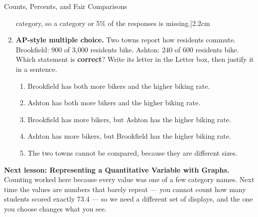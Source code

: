 \documentclass[12pt]{article}
\newcommand{\answerspace}[2]{\par\nopagebreak\noindent\begin{minipage}[t][#1][t]{\linewidth}%
  \color{keyred}\bfseries #2\end{minipage}\par}
\begin{document}
\begin{notesbox}{Counts, Percents, and Fair Comparisons}
\begin{enumerate}[leftmargin=1.9em, itemsep=6pt]
{{        category, so a category or 5\% of the responses is missing.}]{\linewidth}{2.2cm}}
  \tcbbreak
  \item \textbf{AP-style multiple choice.} Two towns report how residents commute. Brookfield: 900 of
        3{,}000 residents bike. Ashton: 240 of 600 residents bike. Which statement is
        \textbf{correct}? Write its letter in the Letter box, then justify it in a sentence.
        \begin{enumerate}[label=\textbf{(\Alph*)}, leftmargin=2.2em, itemsep=2pt]
          \item Brookfield has both more bikers and the higher biking rate.
          \item Ashton has both more bikers and the higher biking rate.
          \item Brookfield has more bikers, but Ashton has the higher biking rate.
          \item Ashton has more bikers, but Brookfield has the higher biking rate.
          \item The two towns cannot be compared, because they are different sizes.
                \hfill{}
        \end{enumerate}
        \answerspace{2.15in}{\normalcolor\mdseries\gradedblank[id=hw5j, type=rubric, points=1,
          display={(C). Brookfield: $900/3000 = 30\%$; Ashton: $240/600 = 40\%$.}]{\linewidth}{2.2cm}}
\end{enumerate}
\end{notesbox}

\vspace{0.12in}

\boxguard[10]
\begin{spiralbox}
\small
\textbf{Next lesson: Representing a Quantitative Variable with Graphs.} Counting worked here
because every value was one of a few category names. Next time the values are numbers that
barely repeat --- you cannot count how many students scored exactly 73.4 --- so we need a
different set of displays, and the one you choose changes what you see.
\end{spiralbox}
\end{document}
